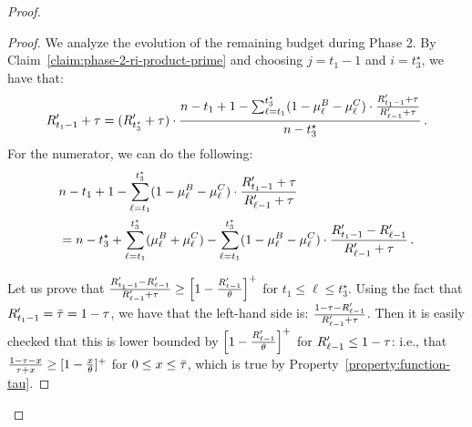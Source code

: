 \begin{proof}
    \begin{proof}
        We analyze the evolution of the remaining budget during Phase 2.
        By Claim~\ref{claim:phase-2-ri-product-prime} and choosing $j=t_1 - 1$ and $i=t_3^\star$, we have that:
        \begin{equation*}
            R'_{t_1 - 1} + \tau = (R'_{t_3^\star} + \tau) \cdot \frac{n-t_1+1-\sum_{\ell=t_1}^{t_3^\star} (1 - \mu_{\ell}^B - \mu_{\ell}^C) \cdot \frac{R'_{t_1-1}+\tau}{R'_{\ell-1}+\tau}}{n-t_3^\star}\,.
        \end{equation*}
        For the numerator, we can do the following:
        \begin{align*}
            &n-t_1+1-\sum_{\ell=t_1}^{t_3^\star} (1 - \mu_{\ell}^B - \mu_{\ell}^C) \cdot \frac{R'_{t_1-1}+\tau}{R'_{\ell-1}+\tau}\\
            &= n-t_3^\star + \sum_{\ell=t_1}^{t_3^\star}(\mu_{\ell}^B+\mu_{\ell}^C)-\sum_{\ell=t_1}^{t_3^\star} (1 - \mu_{\ell}^B - \mu_{\ell}^C) \cdot \frac{R'_{t_1 - 1}-R'_{\ell-1}}{R'_{\ell-1}+\tau}\,.
        \end{align*}

        Let us prove that $\frac{R'_{t_1 - 1}-R'_{\ell-1}}{R'_{\ell-1}+\tau} \geq \left[1-\frac{R'_{\ell-1}}{\theta}\right]^+$ for $t_1 \leq \ell\leq t_3^\star$. Using the fact that $R'_{t_1 - 1}=\bar\tau=1-\tau$, we have that the left-hand side is: $\frac{1-\tau-R'_{\ell-1}}{R'_{\ell-1}+\tau}$. Then it is easily checked that this is lower bounded by $\left[1-\frac{R'_{\ell-1}}{\theta}\right]^+$ for $R'_{\ell - 1} \leq 1-\tau$: i.e., that $\frac{1-\tau-x}{\tau+x} \geq [1-\frac{x}{\theta}]^+$ for $0 \leq x \leq \bar\tau$, which is true by Property~\ref{property:function-tau}.
        

\end{proof}
\end{proof}
